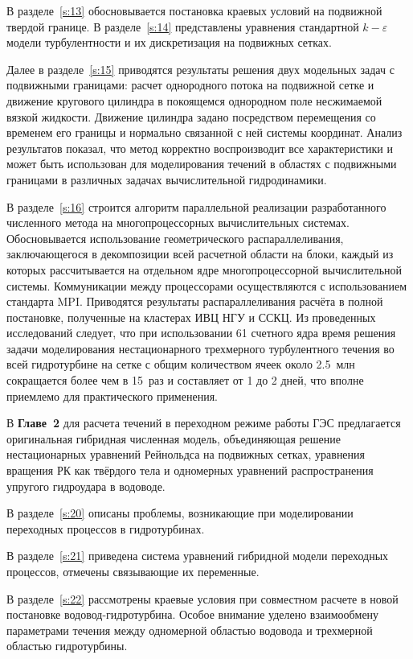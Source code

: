В разделе~\ref{s:13} обосновывается постановка краевых условий на подвижной твердой границе. 
В разделе~\ref{s:14} представлены уравнения стандартной $k - \varepsilon $ модели турбулентности и их 
дискретизация на подвижных сетках. 

Далее в разделе~\ref{s:15} приводятся результаты решения двух модельных задач с подвижными границами: 
расчет однородного потока на подвижной сетке и движение кругового цилиндра в покоящемся однородном поле 
несжимаемой вязкой жидкости. Движение цилиндра задано посредством перемещения со временем 
его границы и нормально связанной с ней системы координат. 
Анализ результатов показал, что метод корректно 
воспроизводит все характеристики и может быть использован для моделирования течений
в областях с подвижными границами в различных задачах вычислительной гидродинамики.

В разделе~\ref{s:16} строится алгоритм параллельной реализации разработанного численного метода
на многопроцессорных вычислительных системах. 
Обосновывается использование геометрического распараллеливания, 
заключающегося в декомпозиции всей расчетной области на блоки, каждый из которых рассчитывается на отдельном 
ядре многопроцессорной вычислительной системы. Коммуникации между процессорами осуществляются с использованием 
стандарта MPI. Приводятся результаты распараллеливания расчёта в полной постановке, 
полученные на кластерах ИВЦ НГУ и ССКЦ. Из проведенных исследований 
следует, что при использовании 61 счетного ядра время решения задачи моделирования нестационарного 
трехмерного турбулентного течения во всей гидротурбине на сетке с общим количеством ячеек 
около 2.5~млн сокращается более чем в 15~раз и составляет от 1 до 2 дней, что вполне приемлемо 
для практического применения.

В \textbf{Главе~2} для расчета течений в переходном режиме работы ГЭС 
предлагается оригинальная гибридная численная модель, объединяющая решение нестационарных 
уравнений Рейнольдса на подвижных сетках, уравнения вращения РК 
как твёрдого тела и одномерных уравнений распространения упругого гидроудара в водоводе. 

В разделе~\ref{s:20} описаны проблемы, возникающие при моделировании переходных процессов в гидротурбинах.  

В разделе~\ref{s:21} приведена система уравнений гибридной модели переходных процессов, отмечены связывающие
их переменные. 

В разделе~\ref{s:22} рассмотрены краевые условия при совместном расчете в новой постановке 
водовод-гидротурбина. Особое внимание уделено взаимообмену параметрами течения между одномерной областью 
водовода и трехмерной областью гидротурбины.

